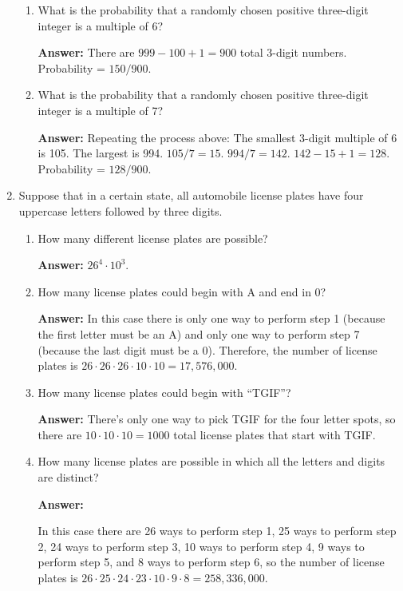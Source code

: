 \documentclass[11pt, letterpaper]{report}
\begin{document}
\begin{enumerate}
\begin{enumerate}
 \item What is the probability that a randomly chosen positive
three-digit integer is a multiple of 6? 

\textbf{Answer:} There are $999-100+1=900$ total 3-digit numbers.  Probability = $150/900$.

\item What is the probability that a randomly chosen positive three-digit integer is a multiple of 7?

\textbf{Answer:} Repeating the process above: 
 The smallest 3-digit multiple of 6 is 105.  The largest is 994.  $105/7=15$.  $994/7=142$.  $142-15+1=128$.  Probability = $128/900$.

\end{enumerate}

\item Suppose that in a certain state, all automobile license plates have four uppercase letters followed by three digits.
\begin{enumerate}
        \item How many different license plates are possible?  
        
        \textbf{Answer:} $26^4 \cdot 10^3$.
        
        \item How many license plates could begin with A and end in 0? 
        
        \textbf{Answer: } In this case there is only one way to perform step 1 (because the first letter must be an A) and only one way to perform step 7 (because the last digit must be a 0). Therefore, the number of license plates is $26\cdot 26 \cdot 26 \cdot 10 \cdot 10 = 17,576,000$.
        
        \item How many license plates could begin with ``TGIF''?
        
        \textbf{Answer: } There's only one way to pick TGIF for the four letter spots, so there are $10 \cdot 10 \cdot 10=1000$ total license plates that start with TGIF.
        
        \item How many license plates are possible in which all the letters and digits are distinct?
        
        \textbf{Answer: }
        
        In this case there are 26 ways to perform step 1, 25 ways to perform step 2, 24 ways to perform step 3, 10 ways to perform step 4, 9 ways to perform step 5, and 8 ways to perform step 6, so the number of license plates is $26 \cdot 25  \cdot 24  \cdot 23  \cdot 10  \cdot 9  \cdot 8 = 258,336,000$.
        

\end{enumerate}
\end{enumerate}
\end{document}
